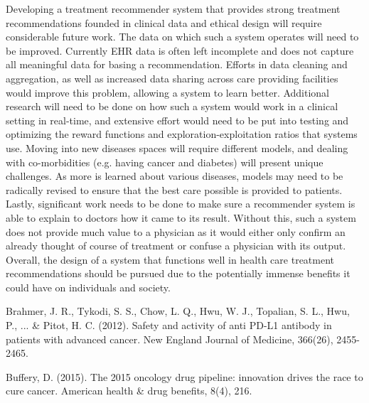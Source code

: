 \documentclass[]{spie}  %
\begin{document}
Developing a treatment recommender system that provides strong treatment recommendations founded in clinical data and ethical design will require considerable future work. The data on which such a system operates will need to be improved. Currently EHR data is often left incomplete and does not capture all meaningful data for basing a recommendation. Efforts in data cleaning and aggregation, as well as increased data sharing across care providing facilities would improve this problem, allowing a system to learn better. Additional research will need to be done on how such a system would work in a clinical setting in real-time, and extensive effort would need to be put into testing and optimizing the reward functions and exploration-exploitation ratios that systems use. Moving into new diseases spaces will require different models, and dealing with co-morbidities (e.g. having cancer and diabetes) will present unique challenges. As more is learned about various diseases, models may need to be radically revised to ensure that the best care possible is provided to patients. Lastly, significant work needs to be done to make sure a recommender system is able to explain to doctors how it came to its result. Without this, such a system does not provide much value to a physician as it would either only confirm an already thought of course of treatment or confuse a physician with its output. Overall, the design of a system that functions well in health care treatment recommendations should be pursued due to the potentially immense benefits it could have on individuals and society.

\clearpage

\appendix



\indent Brahmer, J. R., Tykodi, S. S., Chow, L. Q., Hwu, W. J., Topalian, S. L., Hwu, P., ... & Pitot, H. C. (2012). Safety and activity of anti PD-L1 antibody in patients with advanced cancer. New England Journal of Medicine, 366(26), 2455-2465.

\skiplinehalf

\indent Buffery, D. (2015). The 2015 oncology drug pipeline: innovation drives the race to cure cancer. American health & drug benefits, 8(4), 216.

\skiplinehalf
\end{document}
